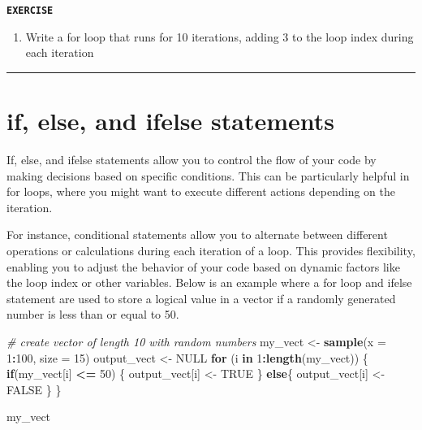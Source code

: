 \documentclass[
]{book}
\newenvironment{Shaded}{\begin{snugshade}}{\end{snugshade}}
\newcommand{\AttributeTok}[1]{\textcolor[rgb]{0.13,0.29,0.53}{#1}}
\newcommand{\CommentTok}[1]{\textcolor[rgb]{0.56,0.35,0.01}{\textit{#1}}}
\newcommand{\ConstantTok}[1]{\textcolor[rgb]{0.56,0.35,0.01}{#1}}
\newcommand{\ControlFlowTok}[1]{\textcolor[rgb]{0.13,0.29,0.53}{\textbf{#1}}}
\newcommand{\DecValTok}[1]{\textcolor[rgb]{0.00,0.00,0.81}{#1}}
\newcommand{\FunctionTok}[1]{\textcolor[rgb]{0.13,0.29,0.53}{\textbf{#1}}}
\newcommand{\NormalTok}[1]{#1}
\newcommand{\OtherTok}[1]{\textcolor[rgb]{0.56,0.35,0.01}{#1}}
\newcommand{\SpecialCharTok}[1]{\textcolor[rgb]{0.81,0.36,0.00}{\textbf{#1}}}
\providecommand{\tightlist}{%
  \setlength{\itemsep}{0pt}\setlength{\parskip}{0pt}}
\begin{document}
\textbf{\texttt{EXERCISE}}

\begin{enumerate}
\def\labelenumi{\arabic{enumi}.}
\tightlist
\item
  Write a for loop that runs for 10 iterations, adding 3 to the loop index during each iteration
\end{enumerate}

\begin{center}\rule{0.5\linewidth}{0.5pt}\end{center}

\section{if, else, and ifelse statements}\label{if-else-and-ifelse-statements}

If, else, and ifelse statements allow you to control the flow of your code by making decisions based on specific conditions. This can be particularly helpful in for loops, where you might want to execute different actions depending on the iteration.

For instance, conditional statements allow you to alternate between different operations or calculations during each iteration of a loop. This provides flexibility, enabling you to adjust the behavior of your code based on dynamic factors like the loop index or other variables. Below is an example where a for loop and ifelse statement are used to store a logical value in a vector if a randomly generated number is less than or equal to 50.

\begin{Shaded}
\begin{Highlighting}[]
\CommentTok{\# create vector of length 10 with random numbers}
\NormalTok{my\_vect }\OtherTok{\textless{}{-}} \FunctionTok{sample}\NormalTok{(}\AttributeTok{x =} \DecValTok{1}\SpecialCharTok{:}\DecValTok{100}\NormalTok{, }\AttributeTok{size =} \DecValTok{15}\NormalTok{)}
\NormalTok{output\_vect }\OtherTok{\textless{}{-}} \ConstantTok{NULL}
\ControlFlowTok{for}\NormalTok{ (i }\ControlFlowTok{in} \DecValTok{1}\SpecialCharTok{:}\FunctionTok{length}\NormalTok{(my\_vect)) \{}
  \ControlFlowTok{if}\NormalTok{(my\_vect[i] }\SpecialCharTok{\textless{}=} \DecValTok{50}\NormalTok{) \{}
\NormalTok{    output\_vect[i] }\OtherTok{\textless{}{-}} \ConstantTok{TRUE}
\NormalTok{  \}}
  \ControlFlowTok{else}\NormalTok{\{}
\NormalTok{    output\_vect[i] }\OtherTok{\textless{}{-}} \ConstantTok{FALSE}
\NormalTok{  \}}
\NormalTok{\}}

\NormalTok{my\_vect}
\end{Highlighting}
\end{Shaded}
\end{document}
